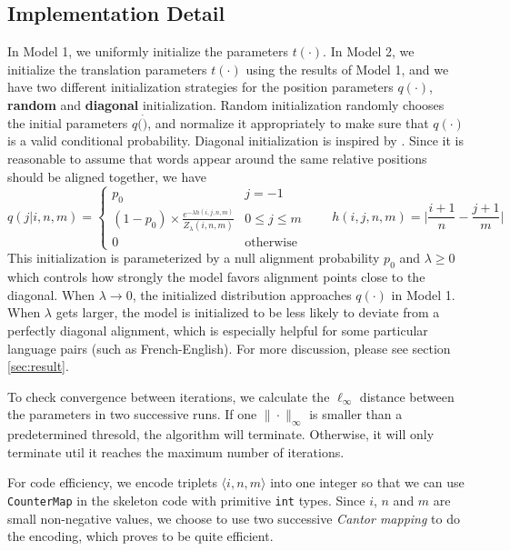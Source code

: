 \documentclass[letterpaper]{article}
\begin{document}
\subsection{Implementation Detail}\label{sec:imp}
In Model 1, we uniformly initialize the parameters $t(\cdot)$.
In Model 2, we initialize the translation parameters $t(\cdot)$ using the results of Model 1, and we have two different initialization strategies for the position parameters $q(\cdot)$, \textbf{random} and \textbf{diagonal} initialization. Random initialization randomly chooses the initial parameters $q(\dot)$, and normalize it appropriately to make sure that $q(\cdot)$ is a valid conditional probability.
Diagonal initialization is inspired by \cite{dyer2013simple}. Since it is reasonable to assume that words appear around the same relative positions should be aligned together,  we have
\begin{equation}
q(j | i, n, m) = \left\{
\begin{array}{cc}
p_0 & j = -1 \\
(1-p_0) \times \frac{e^{-\lambda h(i, j, n, m)}}{Z_\lambda(i, n, m)} & 0 \le j \le m \\
0 & \textrm{otherwise}
\end{array}\right.
\qquad
h(i, j, n, m) = \Bigg| \frac{i+1}{n} - \frac{j+1}{m} \Bigg|
\end{equation}
This initialization is parameterized by a null alignment probability $p_0$ and $\lambda \ge 0$ which controls how strongly the model favors alignment points close to the diagonal.
When $\lambda \rightarrow 0$, the initialized distribution approaches $q(\cdot)$ in Model 1.
When $\lambda$ gets larger, the model is initialized to be less likely to deviate from a perfectly diagonal alignment, which is especially helpful for some particular language pairs (such as French-English). For more discussion, please see section \ref{sec:result}.

\vspace{0.1cm}

To check convergence between iterations, we calculate the $\ell_{\infty}$ distance between the parameters in two successive runs. If one $\| \cdot \|_\infty$ is smaller than a predetermined thresold, the algorithm will terminate. Otherwise, it will only terminate util it reaches the maximum number of iterations.

\vspace{0.1cm}

For code efficiency, we encode triplets $\langle i, n, m \rangle$ into one integer so that we can use \texttt{CounterMap} in the skeleton code with primitive \texttt{int} types. Since $i$, $n$ and $m$ are small non-negative values, we choose to use two successive \emph{Cantor mapping} to do the encoding, which proves to be quite efficient.
\end{document}
